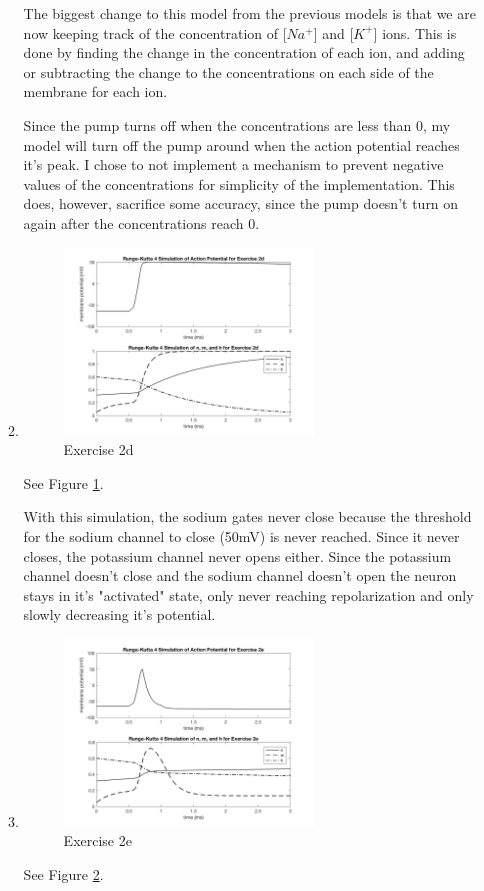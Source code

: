 \documentclass[12pt]{article}
\begin{document}
\begin{enumerate}
\begin{enumerate}
				The biggest change to this model from the previous models is that we are now keeping track of the concentration of [$Na^+$] and [$K^+$] ions. This is done by finding the change in the concentration of each ion, and adding or subtracting the change to the concentrations on each side of the membrane for each ion.
				
				Since the pump turns off when the concentrations are less than 0, my model will turn off the pump around when the action potential reaches it's peak. I chose to not implement a mechanism to prevent negative values of the concentrations for simplicity of the implementation. This does, however, sacrifice some accuracy, since the pump doesn't turn on again after the concentrations reach 0. 
				
			\item
				\begin{figure}[h!]
  			 \includegraphics[width=0.666\textwidth]{2d-1}
  			 \centering
         \caption{Exercise 2d}
         \label{fig:2d-1}
       \end{figure}
				See Figure \ref{fig:2d-1}.
				
				With this simulation, the sodium gates never close because the threshold for the sodium channel to close (50mV) is never reached. Since it never closes, the potassium channel never opens either. Since the potassium channel doesn't close and the sodium channel doesn't open the neuron stays in it's "activated" state, only never reaching repolarization and only slowly decreasing it's potential.
			
			\item
				\begin{figure}[h!]
  			 \includegraphics[width=0.666\textwidth]{2e-1}
  			 \centering
         \caption{Exercise 2e}
         \label{fig:2e-1}
       \end{figure}
				See Figure \ref{fig:2e-1}.
				

\end{enumerate}
\end{enumerate}
\end{document}
